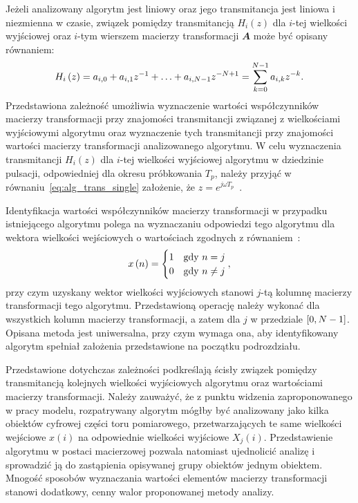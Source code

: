 Jeżeli analizowany algorytm jest liniowy oraz jego transmitancja jest liniowa i niezmienna w czasie, związek pomiędzy transmitancją $H_{i}(z)$ dla $i$-tej wielkości wyjściowej oraz $i$-tym wierszem macierzy transformacji $\mathbfit{A}$ może być opisany równaniem:
\begin{equation}
H_{i} \left(z\right) = a_{i, 0} + a_{i, 1} z^{-1} + \hdots + a_{i, N-1} z^{-N+1} = \sum _{k = 0} ^{N-1} a_{i, k} z^{-k} \label{eq:alg_trans_single}.
\end{equation}
Przedstawiona zależność umożliwia wyznaczenie wartości współczynników macierzy transformacji przy znajomości transmitancji związanej z wielkościami wyjściowymi algorytmu oraz wyznaczenie tych transmitancji przy znajomości wartości macierzy transformacji analizowanego algorytmu. W celu wyznaczenia transmitancji $H_{i}(z)$ dla $i$-tej wielkości wyjściowej algorytmu w dziedzinie pulsacji, odpowiedniej dla okresu próbkowania $T_{p}$, należy przyjąć w równaniu~\eqref{eq:alg_trans_single} założenie, że $z = e^{j\omega T_{p}}$~\cite{proakis_dsp}.

Identyfikacja wartości współczynników macierzy transformacji w przypadku istniejącego algorytmu polega na wyznaczaniu odpowiedzi tego algorytmu dla wektora wielkości wejściowych o wartościach zgodnych z równaniem~\cite{jakubiec_algorithms, jakubiec_system}:
\begin{equation}
x \emb{n} =
\begin{cases}
	1 & $gdy$~n = j \\
	0 & $gdy$~n \neq j
\end{cases}
\label{eq:wt_ident},
\end{equation}
przy czym uzyskany wektor wielkości wyjściowych stanowi $j$-tą kolumnę macierzy transformacji tego algorytmu. Przedstawioną operację należy wykonać dla wszystkich kolumn macierzy transformacji, a zatem dla $j$ w przedziale $\interval{0}{N-1}$. Opisana metoda jest uniwersalna, przy czym wymaga ona, aby identyfikowany algorytm spełniał założenia przedstawione na początku podrozdziału.

Przedstawione dotychczas zależności podkreślają ścisły związek pomiędzy transmitancją kolejnych wielkości wyjściowych algorytmu oraz wartościami macierzy transformacji. Należy zauważyć, że z punktu widzenia zaproponowanego w pracy modelu, rozpatrywany algorytm mógłby być analizowany jako kilka obiektów cyfrowej części toru pomiarowego, przetwarzających te same wielkości wejściowe $x(i)$ na odpowiednie wielkości wyjściowe $X_{j}(i)$. Przedstawienie algorytmu w postaci macierzowej pozwala natomiast ujednolicić analizę i sprowadzić ją do zastąpienia opisywanej grupy obiektów jednym obiektem. Mnogość sposobów wyznaczania wartości elementów macierzy transformacji stanowi dodatkowy, cenny walor proponowanej metody analizy.

